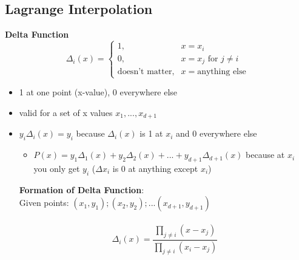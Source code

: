\documentclass{article}\usepackage{amsmath,amssymb,amsthm,tikz,tkz-graph,color,chngpage,soul,hyperref,csquotes,graphicx,floatrow}\newcommand*{\QEDB}{\hfill\ensuremath{\square}}\newtheorem*{prop}{Proposition}\renewcommand{\theenumi}{\alph{enumi}}\usepackage[shortlabels]{enumitem}\usepackage[nobreak=true]{mdframed}\usetikzlibrary{matrix,calc}\MakeOuterQuote{"}\usepackage[margin=0.75in]{geometry} \newtheorem{theorem}{Theorem}
\begin{document}
\subsection*{Lagrange Interpolation}
\textbf{Delta Function}
$$
\Delta_i(x) =
\begin{cases}
1, & x =x_i \\
0, & x =x_j \text{ for } j\ne i \\
\text{doesn't matter}, & x = \text{anything else}
\end{cases}
$$
\begin{itemize}
\item 1 at one point (x-value), 0 everywhere else
\item valid for a set of x values $x_1, ..., x_{d+1}$
\item $y_i\Delta_i(x) = y_i$ because $\Delta_i(x)$ is 1 at $x_i$ and 0 everywhere else
	\begin{itemize}[label=$\star$]
	\item $P(x) = y_1\Delta_1(x) + y_2\Delta_2(x) + ... + y_{d+1}\Delta_{d+1}(x)$ because at $x_i$ you only get $y_i$ ($\Delta{x_i}$ is 0 at anything except $x_i$)
	\end{itemize}
\begin{mdframed}
\textbf{Formation of Delta Function}:\\
Given points: $(x_1, y_1); (x_2, y_2); ... (x_{d+1}, y_{d+1})$\\\\
\begin{equation}\Delta_i(x) = \frac{\prod_{j\ne i}(x-x_j)}{\prod_{j\ne i}(x_i-x_j)}\end{equation}
\end{mdframed}
\end{itemize}
\end{document}
